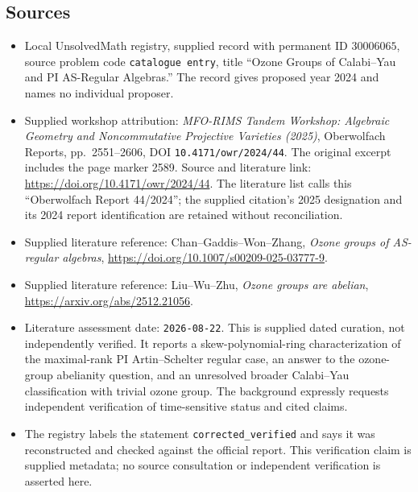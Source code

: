 \documentclass[11pt]{article}
\begin{document}
\subsection{Sources}
\begin{itemize}
\item Local UnsolvedMath registry, supplied record with permanent ID \(30006065\), source problem code \texttt{catalogue entry}, title ``Ozone Groups of Calabi--Yau and PI AS-Regular Algebras.'' The record gives proposed year 2024 and names no individual proposer.
\item Supplied workshop attribution: \emph{MFO-RIMS Tandem Workshop: Algebraic Geometry and Noncommutative Projective Varieties (2025)}, Oberwolfach Reports, pp.~2551--2606, DOI \texttt{10.4171/owr/2024/44}. The original excerpt includes the page marker 2589. Source and literature link: \url{https://doi.org/10.4171/owr/2024/44}. The literature list calls this ``Oberwolfach Report 44/2024''; the supplied citation's 2025 designation and its 2024 report identification are retained without reconciliation.
\item Supplied literature reference: Chan--Gaddis--Won--Zhang, \emph{Ozone groups of AS-regular algebras}, \url{https://doi.org/10.1007/s00209-025-03777-9}.
\item Supplied literature reference: Liu--Wu--Zhu, \emph{Ozone groups are abelian}, \url{https://arxiv.org/abs/2512.21056}.
\item Literature assessment date: \texttt{2026-08-22}. This is supplied dated curation, not independently verified. It reports a skew-polynomial-ring characterization of the maximal-rank PI Artin--Schelter regular case, an answer to the ozone-group abelianity question, and an unresolved broader Calabi--Yau classification with trivial ozone group. The background expressly requests independent verification of time-sensitive status and cited claims.
\item The registry labels the statement \texttt{corrected\_verified} and says it was reconstructed and checked against the official report. This verification claim is supplied metadata; no source consultation or independent verification is asserted here.
\end{itemize}
\end{document}
